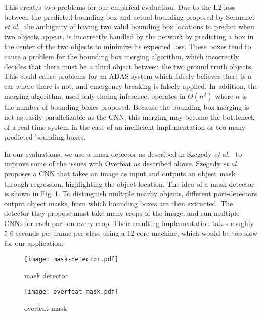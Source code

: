 \documentclass[journal]{IEEEtran}
\begin{document}
This creates two problems for our empirical evaluation. Due to the L2 loss between the predicted bounding box and actual bounding proposed by Sermanet \textit{et al.}, the ambiguity of having two valid bounding box locations to predict when two objects appear, is incorrectly handled by the network by predicting a box in the center of the two objects to minimize its expected loss. These boxes tend to cause a problem for the bounding box merging algorithm, which incorrectly decides that there must be a third object between the two ground truth objects. This could cause problems for an ADAS system which falsely believes there is a car where there is not, and emergency breaking is falsely applied. In addition, the merging algorithm, used only during inference, operates in $O(n^2)$ where $n$ is the number of bounding boxes proposed. Because the bounding box merging is not as easily parallelizable as the CNN, this merging may become the bottleneck of a real-time system in the case of an inefficient implementation or too many predicted bounding boxes.  

In our evaluations, we use a mask detector as described in Szegedy \textit{et al.}~\cite{szegedy-2013} to improve some of the issues with Overfeat as described above. Szegedy \textit{et al.} proposes a CNN that takes an image as input and outputs an object mask through regression, highlighting the object location. The idea of a mask detector is shown in Fig~\ref{fig:mask-detector}. To distinguish multiple nearby objects, different part-detectors output object masks, from which bounding boxes are then extracted. The detector they propose must take many crops of the image, and run multiple CNNs for each part on every crop. Their resulting implementation takes roughly $5$-$6$ seconds per frame per class using a 12-core machine, which would be too slow for our application. 

\begin{figure}[tb]
  \centering
    \texttt{[image: mask-detector.pdf]}
 \caption{mask detector}
 \label{fig:mask-detector}
\end{figure}


\begin{figure*}[tb]
  \centering
    \texttt{[image: overfeat-mask.pdf]}
 \caption{overfeat-mask}
 \label{fig:overfeat-mask}
\end{figure*}
\end{document}
